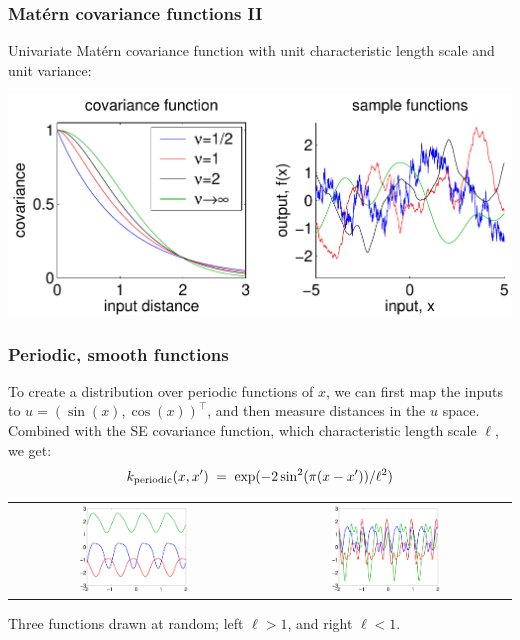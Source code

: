 \begin{frame}
\frametitle{Matérn covariance functions II}

Univariate Matérn covariance function with unit characteristic length scale
and unit variance:

\includegraphics[width=\textwidth]{matern}
\end{frame}


\begin{frame}
\frametitle{Periodic, smooth functions}
To create a distribution over periodic functions of $x$, we can first map the
inputs to $u=(\sin(x),\cos(x))^\top$, and then measure distances in the $u$
space. Combined with the SE covariance function, which characteristic length
scale $\ell$, we get:
\[
k_{\rm periodic}(x,x')\;=\;\exp(-2\sin^2(\pi(x-x'))/\ell^2)
\]
\begin{center}
\begin{tabular}{cc}
\includegraphics[width=0.45\textwidth]{per00} &
\includegraphics[width=0.45\textwidth]{per01}
\end{tabular}
\end{center}
Three functions drawn at random; left $\ell>1$, and right $\ell<1$.
\end{frame}


